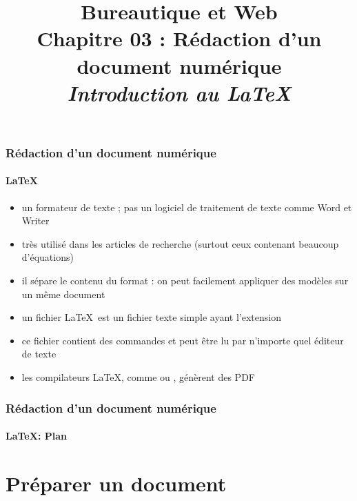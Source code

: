 \documentclass[xcolor=table]{beamer}
\title[BWEB : 03- Rédaction (\LaTeX)] %
{Bureautique et Web \\Chapitre 03 : Rédaction d'un document numérique \\ \slshape\small Introduction au \LaTeX}
\begin{document}
\begin{frame}
\frametitle{Rédaction d'un document numérique}
\framesubtitle{\LaTeX}

\begin{itemize}
	\item un formateur de texte ; pas un logiciel de traitement de texte comme Word et Writer
	\item très utilisé dans les articles de recherche (surtout ceux contenant beaucoup d'équations)
	\item il sépare le contenu du format : on peut facilement appliquer des modèles sur un même document
	\item un fichier \LaTeX\ est un fichier texte simple ayant l'extension 
	\item ce fichier contient des commandes et peut être lu par n'importe quel éditeur de texte
	\item les compilateurs \LaTeX, comme  ou , génèrent des PDF
	
\end{itemize}

\end{frame}

\begin{frame}
\frametitle{Rédaction d'un document numérique}
\framesubtitle{\LaTeX : Plan}

\begin{multicols}{2}
\tableofcontents
\end{multicols}
\end{frame}

\section{Préparer un document}
\end{document}
